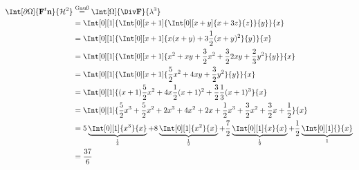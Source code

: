 \begin{solution}
\begin{align*}
    \Int[\partial \Omega]
     {
         \mathbf F^t \mathbf n
     }{
         \mathcal H^2
     }
     & \stackrel
     {
         \text{Gauß}
     }{=}
     \Int[\Omega]
     {
         \Div \mathbf F
     }{
         \lambda^3
     } \\
     & =
     \Int[0][1]
     {
        \Int[0][x + 1]
        {
            \Int[0][x+y]
            {
                x + 3 z
            }{z}
        }{y}
     }{x} \\
     & =
     \Int[0][1]
     {
        \Int[0][x + 1]
        {
            x (x + y)
            +
            3 \frac{1}{2} (x + y)^2
        }{y}
    }{x} \\
    & =
     \Int[0][1]
     {
        \Int[0][x + 1]
        {
            x^2
            +
            x y
            +
            \frac{3}{2} x^2
            +
            \frac{3}{2} 2 x y
            +
            \frac{2}{3} y^2
        }{y}
    }{x} \\
    & =
     \Int[0][1]
     {
        \Int[0][x + 1]
        {
            \frac{5}{2} x^2
            +
            4 x y
            +
            \frac{3}{2} y^2
        }{y}
    }{x} \\
    & =
     \Int[0][1]
     {
        (x + 1) \frac{5}{2} x^2
        +
        4 x \frac{1}{2} (x + 1)^2
        +
        \frac{3}{2} \frac{1}{3} (x + 1)^3
    }{x} \\
    & =
     \Int[0][1]
     {
        \frac{5}{2} x^3
        +
        \frac{5}{2} x^2
        +
        2 x^3
        +
        4 x^2
        +
        2 x
        +
        \frac{1}{2} x^3
        +
        \frac{3}{2} x^2
        +
        \frac{3}{2} x
        +
        \frac{1}{2}
    }{x} \\
    & =
    5
    \underbrace
    {
        \Int[0][1]
        {
            x^3
        }{x}
    }_\frac{1}{4}
    +
    8
    \underbrace
    {
        \Int[0][1]
        {
            x^2
        }{x}
    }_\frac{1}{3}
    +
    \frac{7}{2}
    \underbrace
    {
        \Int[0][1]
        {
            x
        }{x}
    }_\frac{1}{2}
    +
    \frac{1}{2}
    \underbrace
    {
        \Int[0][1]{}{x}
    }_1 \\
    & =
    \frac{37}{6}
\end{align*}

\end{solution}

